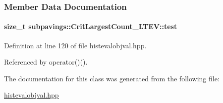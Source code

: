 \subsubsection{\-Member \-Data \-Documentation}
\hypertarget{classsubpavings_1_1CritLargestCount__LTEV_a49fe3740ffe286d9295c935d8f1f902d}{
\paragraph[{test}]{\setlength{\rightskip}{0pt plus 5cm}size\-\_\-t {\bf subpavings\-::\-Crit\-Largest\-Count\-\_\-\-L\-T\-E\-V\-::test}}}\label{classsubpavings_1_1CritLargestCount__LTEV_a49fe3740ffe286d9295c935d8f1f902d}


\-Definition at line 120 of file histevalobjval.\-hpp.



\-Referenced by operator()().



\-The documentation for this class was generated from the following file\-:\begin{DoxyCompactItemize}
\item 
\hyperlink{histevalobjval_8hpp}{histevalobjval.\-hpp}\end{DoxyCompactItemize}
